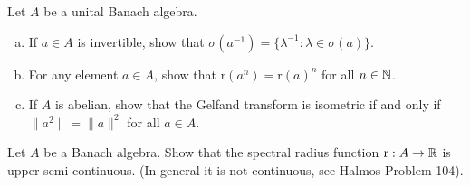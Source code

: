 \begin{exercise}
	Let $A$ be a unital Banach algebra.
	\begin{enumerate}[(a)]
		\item If $a\in A$ is invertible, show that $\sigma(a^{-1})=\{\lambda^{-1}:\lambda\in\sigma(a)\}$.
		\item For any element $a\in A$, show that $\mathrm{r}(a^n)=\mathrm{r}(a)^n$ for all $n\in\mathbb{N}$.
		\item If $A$ is abelian, show that the Gelfand transform is isometric if and only if $\|a^2\|=\|a\|^2$ for all $a\in A$.
	\end{enumerate}
\end{exercise}

\begin{exercise}
	Let $A$ be a Banach algebra. Show that the spectral radius function $\mathrm{r}:A\to\mathbb{R}$ is upper semi-continuous. (In general it is not continuous, see Halmos Problem 104).
\end{exercise}
